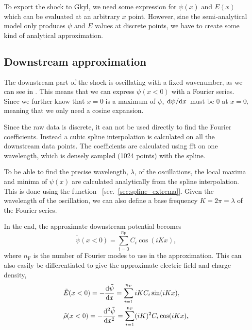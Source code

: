 \documentclass[11pt,a4paper, 
swedish, english %
]{article}
\begin{document}
To export the shock to Gkyl, we need some expression for $\psi(x)$ and
$E(x)$ which can be evaluated at an arbitrary $x$ point. However, sine
the semi-analytical model only produces $\psi$ and $E$ values at
discrete points, we have to create some kind of analytical
approximation.

\subsection{Downstream approximation}
The downstream part of the shock is oscillating with a fixed
wavenumber, as we can see in . This means that we
can express $\psi(x<0)$ with a Fourier series. Since we further know
that $x=0$ is a maximum of $\psi$, $\dv*{\psi}{x}$ must be $0$ at
$x=0$, meaning that we only need a cosine expansion.

Since the raw data is discrete, it can not be used directly to find
the Fourier coefficients. Instead a cubic spline interpolation is
calculated on all the downstream data points. The coefficients are
calculated using fft on one wavelength, which is densely sampled (1024
points) with the spline.

To be able to find the precise wavelength, $\lambda$, of the
oscillations, the local maxima and minima of $\psi(x)$ are calculated
analytically from the spline interpolation. This is done using the
function ~[sec.~\ref{sec:spline_extrema}].
Given the wavelength of the oscillation, we can also define a base
frequency $K=2\pi=\lambda$ of the Fourier series.

In the end, the approximate downstream potential becomes
\begin{equation}
\tilde{\psi}(x<0) = \sum_{i=0}^{n_\text{F}} C_{i}\cos(iKx),
\end{equation}
where $n_\text{F}$ is the number of Fourier modes to use in the
approximation. This can also easily be differentiated to give the
approximate electric field and charge density,
\begin{equation}
\begin{aligned}
&\tilde{E}(x<0)=-\dv{\tilde\psi}{x}
=\sum_{i=1}^{n_\text{F}} iKC_{i}\sin(iKx),\\
&\tilde\rho(x<0)=-\dv[2]{\tilde\psi}{x}
=\sum_{i=1}^{n_\text{F}} (iK)^2C_{i}\cos(iKx),\\
\end{aligned}
\end{equation}
\end{document}
